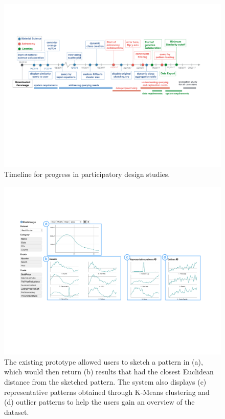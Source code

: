 \begin{figure}[h!]
	\centering
  \includegraphics[width=\linewidth]{figures/timeline.pdf}
	\caption{Timeline for progress in participatory design studies.}
	\label{timeline}
	\vspace{-10pt}
\end{figure}
\begin{figure}[h!]
	\centering
	\includegraphics[width=0.9\linewidth]{figures/oldZV_nozql.pdf}
	\caption{The existing \zv prototype allowed users to sketch a pattern in (a), which would then return (b) results that had the closest Euclidean distance from the sketched pattern. The system also displays (c) representative patterns obtained through K-Means clustering and (d) outlier patterns to help the users gain an overview of the dataset.}
	\label{oldZV}
  \vspace{-5pt}
\end{figure}
